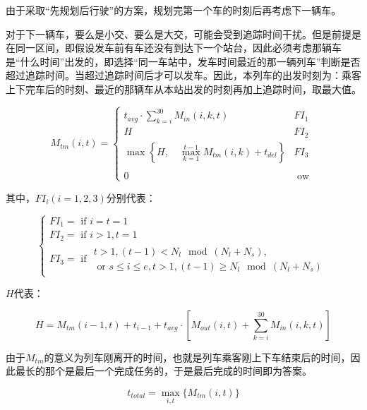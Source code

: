 由于采取“先规划后行驶”的方案，规划完第一个车的时刻后再考虑下一辆车。

对于下一辆车，要么是小交、要么是大交，可能会受到追踪时间干扰。但是前提是在同一区间，即假设发车前有车还没有到达下一个站台，因此必须考虑那辆车是“什么时间”出发的，即选择“同一车站中，发车时间最近的那一辆列车”判断是否超过追踪时间。当超过追踪时间后才可以发车。因此，本列车的出发时刻为：乘客上下完车后的时刻、最近的那辆车从本站出发的时刻再加上追踪时间，取最大值。

\begin{equation}
M_{tm}(i, t) = 
	\begin{cases}
		t_{avg} \cdot \sum _{k = i} ^{30} M_{in}(i, k, t) &  FI_1\\
		H & FI_2\\
		\max \left\{ 
			H, \quad
			\max _{k = 1} ^{t - 1}M_{tm}(i, k) + t_{del}
		\right\} & FI_3\\
		 \\
		0 & \text{ ow }
	\end{cases}
\end{equation}

其中，$FI_i(i=1,2,3)$分别代表：

\begin{equation*}
    \begin{cases}
        FI_1 = \text{ if } i = t = 1   \\
        FI_2 = \text{ if } i > 1, t = 1    \\
        FI_3 = \text{ if }\begin{matrix}
            t > 1, (t - 1) < N_l \mod (N_l + N_s),  \\
            \text{ or } s \leq i \leq e, t > 1, (t - 1) \geq N_l \mod (N_l + N_s)
            \end{matrix}
    \end{cases}
\end{equation*}

$H$代表：

\begin{equation*}
    H = M_{tm}(i - 1, t) + t_{i - 1} + t_{avg} \cdot \left[
			M_{out}(i, t) + \sum _{k = i} ^{30} M_{in}(i, k, t)
		\right]
\end{equation*}

由于$M_{tm}$的意义为列车刚离开的时间，也就是列车乘客刚上下车结束后的时间，因此最长的那个是最后一个完成任务的，于是最后完成的时间即为答案。

\begin{equation}
t_{total} = \max _{i, t} \{M_{tm}(i, t)\}
\end{equation}


